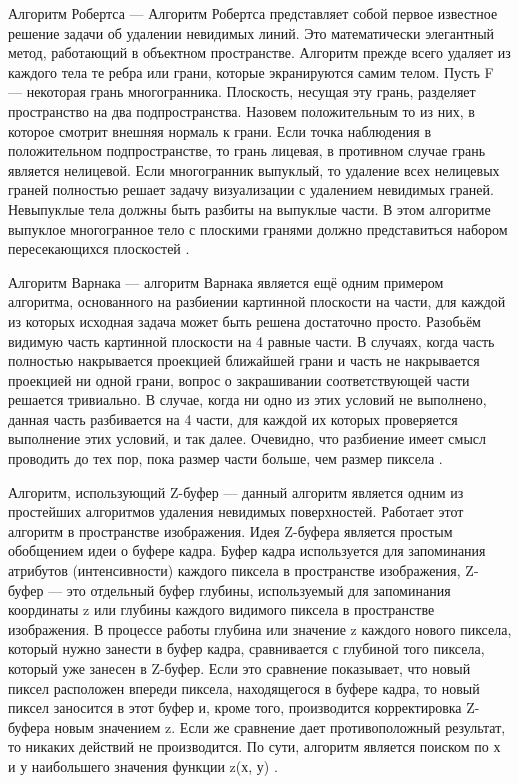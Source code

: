 Алгоритм Робертса --- Алгоритм Робертса представляет собой первое известное решение задачи об удалении невидимых линий. Это математически элегантный метод, работающий в объектном пространстве. Алгоритм прежде всего удаляет из каждого тела те ребра или грани, которые экранируются самим телом. Пусть F --- некоторая грань многогранника. Плоскость, несущая эту грань, разделяет пространство на два подпространства. Назовем положительным то из них, в которое смотрит внешняя нормаль к грани. Если точка наблюдения в положительном подпространстве, то грань лицевая, в противном случае  грань является нелицевой. Если многогранник выпуклый, то удаление всех нелицевых граней полностью решает задачу визуализации с удалением невидимых граней. Невыпуклые тела должны быть разбиты на выпуклые части. В этом алгоритме выпуклое многогранное тело с плоскими гранями должно представиться набором пересекающихся плоскостей \cite{cgshish}.

Алгоритм Варнака --- алгоритм Варнака является ещё одним примером алгоритма, основанного на разбиении картинной плоскости на части, для каждой из которых исходная задача может быть решена достаточно просто. Разобьём видимую часть картинной плоскости на 4 равные части. В случаях, когда часть полностью накрывается проекцией ближайшей грани и часть не накрывается проекцией ни одной грани, вопрос о закрашивании соответствующей части решается тривиально. В случае, когда ни одно из этих условий не выполнено, данная часть разбивается на 4 части, для каждой их которых проверяется выполнение этих условий, и так далее. Очевидно, что разбиение имеет смысл проводить до тех пор, пока размер части больше, чем размер пиксела \cite{cgshish_2}.

Алгоритм, использующий Z-буфер --- данный алгоритм является одним из простейших алгоритмов удаления невидимых поверхностей. Работает этот алгоритм в пространстве изображения. Идея Z-буфера является простым обобщением идеи о буфере кадра. Буфер кадра используется для запоминания атрибутов (интенсивности) каждого пиксела в пространстве изображения, Z-буфер --- это отдельный буфер глубины, используемый для запоминания координаты z или глубины каждого видимого пиксела в пространстве изображения. В процессе работы глубина или значение z каждого нового пиксела, который нужно занести в буфер кадра, сравнивается с глубиной того пиксела, который уже занесен в Z-буфер. Если это сравнение показывает, что новый пиксел расположен впереди пиксела, находящегося в буфере кадра, то новый пиксел заносится в этот буфер и, кроме того, производится корректировка Z-буфера новым значением z. Если же сравнение дает противоположный результат, то никаких действий не производится. По сути, алгоритм является поиском по х и у наибольшего значения функции z(х, у) \cite{cgshish}.

